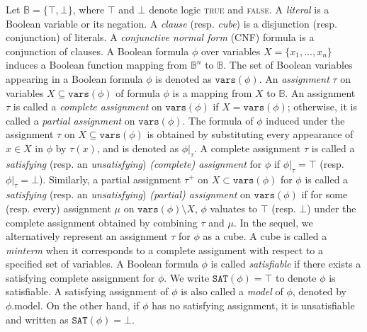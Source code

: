 Let $\mathbb{B}=\{\top, \bot\}$, where $\top$ and $\bot$ denote logic \textsc{true} and \textsc{false}.
A \emph{literal} is a Boolean variable or its negation.
A \emph{clause} (resp. \emph{cube}) is a disjunction (resp. conjunction) of literals. A \emph{conjunctive normal form} (CNF) formula is a conjunction of clauses.
A Boolean formula $\phi$ over variables $X = \{x_1, \ldots, x_n\}$ induces a Boolean function mapping from $\mathbb{B}^n$ to $\mathbb{B}$.
The set of Boolean variables appearing in a Boolean formula $\phi$ is denoted as $\mathtt{vars}(\phi)$.
An \emph{assignment} $\tau$ on variables $X \subseteq \mathtt{vars}(\phi)$ of formula $\phi$ is a mapping from $X$ to $\mathbb{B}$.
An assignment $\tau$ is called a \emph{complete assignment} on $\mathtt{vars}(\phi)$ if $X=\mathtt{vars}(\phi)$; otherwise, it is called a \emph{partial assignment} on $\mathtt{vars}(\phi)$.
The formula of $\phi$ induced under the assignment $\tau$ on $X \subseteq \mathtt{vars}(\phi)$ is obtained by substituting every appearance of $x \in X$ in $\phi$ by $\tau(x)$, and is denoted as $\phi|_\tau$.
A complete assignment $\tau$ is called a \emph{satisfying} (resp. an \emph{unsatisfying}) \emph{(complete) assignment} for $\phi$ if $\phi|_\tau=\top$ (resp. $\phi|_\tau=\bot$).
Similarly, a partial assignment $\tau^+$ on $X \subset \mathtt{vars}(\phi)$ for $\phi$ is called a \emph{satisfying} (resp. an \emph{unsatisfying}) \emph{(partial) assignment} on $\mathtt{vars}(\phi)$ if for some (resp. every) assignment $\mu$ on $\mathtt{vars}(\phi)\setminus X$, $\phi$ valuates to $\top$ (resp. $\bot$) under the complete assignment obtained by combining $\tau$ and $\mu$.
In the sequel, we alternatively represent an assignment $\tau$ for $\phi$ as a cube.
A cube is called a \emph{minterm} when it corresponds to a complete assignment with respect to a specified set of variables.
A Boolean formula $\phi$ is called \emph{satisfiable} if there exists a satisfying complete assignment for $\phi$. We write $\mathtt{SAT}(\phi)=\top$ to denote $\phi$ is satisfiable.
A satisfying assignment of $\phi$ is also called a \emph{model} of $\phi$, denoted by $\phi.\mathrm{model}$.
On the other hand, if $\phi$ has no satisfying assignment, it is unsatisfiable and written as $\mathtt{SAT}(\phi)=\bot$.

